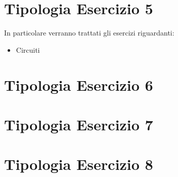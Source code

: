 \section{Tipologia Esercizio 5}
In particolare verranno trattati gli esercizi riguardanti:
\begin{itemize}
\item Circuiti 
\end{itemize}



\clearpage
\section{Tipologia Esercizio 6}
\section{Tipologia Esercizio 7}
\section{Tipologia Esercizio 8}


